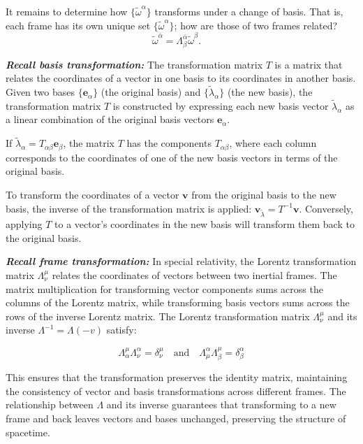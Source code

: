 \documentclass[12pt]{book}
\begin{document}
    It remains to determine how \(\{\tilde{\omega}^\alpha\}\) transforms under a change of basis. That is, each frame has its own unique set \(\{\tilde{\omega}^\alpha\}\); how are those of two frames related?
    \[
    \tilde{\omega}^{\bar{\alpha}} = \Lambda^{\bar{\alpha}}_{\beta} \tilde{\omega}^\beta. \quad \tag{3.13}
    \]

    \textit{\textbf{Recall basis transformation: }} The transformation matrix \( T \) is a matrix that relates the coordinates of a vector in one basis to its coordinates in another basis. Given two bases \(\{\mathbf{e}_\alpha\}\) (the original basis) and \(\{\tilde{\lambda}_\alpha\}\) (the new basis), the transformation matrix \( T \) is constructed by expressing each new basis vector \(\tilde{\lambda}_\alpha\) as a linear combination of the original basis vectors \(\mathbf{e}_\alpha\). 

    If \( \tilde{\lambda}_\alpha = T_{\alpha\beta} \mathbf{e}_\beta \), the matrix \( T \) has the components \( T_{\alpha\beta} \), where each column corresponds to the coordinates of one of the new basis vectors in terms of the original basis. 
        
    To transform the coordinates of a vector \( \mathbf{v} \) from the original basis to the new basis, the inverse of the transformation matrix is applied: \( \mathbf{v}_{\tilde{\lambda}} = T^{-1} \mathbf{v} \). Conversely, applying \( T \) to a vector's coordinates in the new basis will transform them back to the original basis.

    \textbf{\textit{Recall frame transformation:}} In special relativity, the Lorentz transformation matrix \(\Lambda^\mu_\nu\) relates the coordinates of vectors between two inertial frames. The matrix multiplication for transforming vector components sums across the columns of the Lorentz matrix, while transforming basis vectors sums across the rows of the inverse Lorentz matrix. The Lorentz transformation matrix \(\Lambda^\mu_\nu\) and its inverse \(\Lambda^{-1} = \Lambda(-v)\) satisfy:

    \[
    \Lambda^\mu_\alpha \Lambda^\alpha_\nu = \delta^\mu_\nu
    \quad \text{and} \quad
    \Lambda^\alpha_\mu \Lambda^\mu_\beta = \delta^\alpha_\beta
    \]
    
    This ensures that the transformation preserves the identity matrix, maintaining the consistency of vector and basis transformations across different frames. The relationship between \(\Lambda\) and its inverse guarantees that transforming to a new frame and back leaves vectors and bases unchanged, preserving the structure of spacetime.
\end{document}
